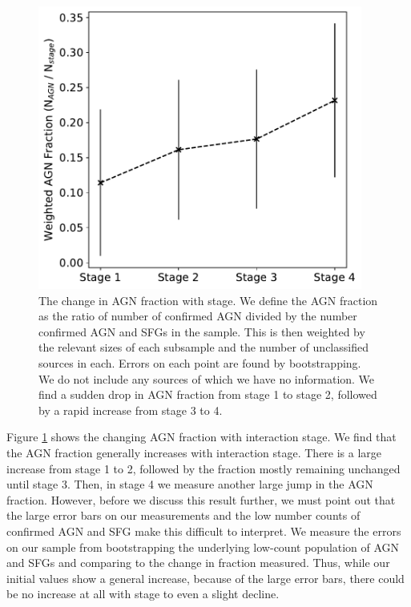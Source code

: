 \begin{figure}
    \centering
    \includegraphics[width=0.95\textwidth]{Chapter3/figures/agn-frac-time.pdf}
    \caption{The change in AGN fraction with stage. We define the AGN fraction as the ratio of number of confirmed AGN divided by the number confirmed AGN and SFGs in the sample. This is then weighted by the relevant sizes of each subsample and the number of unclassified sources in each. Errors on each point are found by bootstrapping. We do not include any sources of which we have no information. We find a sudden drop in AGN fraction from stage 1 to stage 2, followed by a rapid increase from stage 3 to 4.}
    \label{fig:agn-frac-time}
\end{figure}

Figure \ref{fig:agn-frac-time} shows the changing AGN fraction with interaction stage. We find that the AGN fraction generally increases with interaction stage. There is a large increase from stage 1 to 2, followed by the fraction mostly remaining unchanged until stage 3. Then, in stage 4 we measure another large jump in the AGN fraction. However, before we discuss this result further, we must point out that the large error bars on our measurements and the low number counts of confirmed AGN and SFG make this difficult to interpret. We measure the errors on our sample from bootstrapping the underlying low-count population of AGN and SFGs and comparing to the change in fraction measured. Thus, while our initial values show a general increase, because of the large error bars, there could be no increase at all with stage to even a slight decline.

